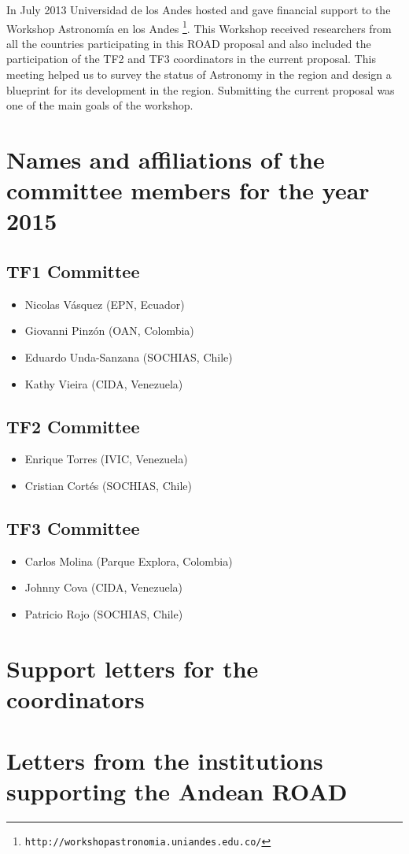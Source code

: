 \documentclass[12pt]{article}
\begin{document}
In July 2013 Universidad de los Andes hosted and gave financial
support to the Workshop Astronomía en los
Andes \footnote{\texttt{http://workshopastronomia.uniandes.edu.co/}}. This
Workshop received researchers from all the countries participating in
this ROAD proposal and also included the participation of the TF2 and
TF3 coordinators in the current proposal. This meeting helped us to
survey the status of Astronomy in the region and design a blueprint
for its development in the region. Submitting the current proposal was
one of the main goals of the workshop. 
 
\newpage



\section{Names and affiliations of the committee members for the year 2015}

\subsection*{TF1 Committee}
\begin{itemize}
\item Nicolas V\'asquez (EPN, Ecuador)
\item Giovanni Pinz\'on (OAN, Colombia)
\item Eduardo Unda-Sanzana (SOCHIAS, Chile)
\item Kathy Vieira (CIDA, Venezuela)
\end{itemize}

\subsection*{TF2 Committee}
\begin{itemize}
\item Enrique Torres  (IVIC, Venezuela)
\item Cristian Cort\'es (SOCHIAS, Chile)
\end{itemize}

\subsection*{TF3 Committee}
\begin{itemize}
\item Carlos Molina (Parque Explora, Colombia)
\item Johnny Cova (CIDA, Venezuela)
\item Patricio Rojo (SOCHIAS, Chile)
\end{itemize}

\newpage
\section{Support letters for the coordinators}

\newpage
\section{Letters from the institutions supporting the Andean ROAD}
\end{document}

